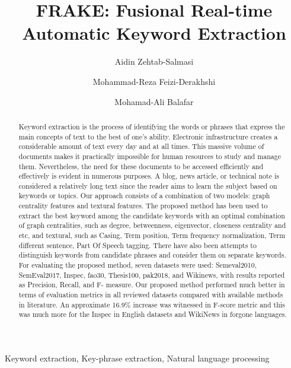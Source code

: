 \documentclass[3p]{elsarticle}
\begin{document}
\begin{frontmatter}

\title{
FRAKE: Fusional Real-time Automatic Keyword Extraction\\
}


\author[cominsys]{Aidin Zehtab-Salmasi}
\author[cominsys]{Mohammad-Reza Feizi-Derakhshi}

\author[UT]{Mohamad-Ali Balafar}


\address[cominsys]{Computerized Intelligence Systems Laboratory, Department of Computer Engineering, University of Tabriz, Tabriz, IRAN.}
\address[UT]{Department of Computer Engineering, University of Tabriz, Tabriz, IRAN.}

\begin{abstract}
{Keyword extraction is the process of identifying the words or phrases that express the main concepts of text to the best of one's ability. Electronic infrastructure creates a considerable amount of text every day and at all times. This massive volume of documents makes it practically impossible for human resources to study and manage them. Nevertheless, the need for these documents to be accessed efficiently and effectively is evident in numerous purposes. A blog, news article, or technical note is considered a relatively long text since the reader aims to learn the subject based on keywords or topics. Our approach consists of a combination of two models: graph centrality features and textural features. The proposed method has been used to extract the best keyword among the candidate keywords with an optimal combination of graph centralities, such as degree, betweenness, eigenvector, closeness centrality and etc, and textural, such as Casing, Term position, Term frequency normalization, Term different sentence, Part Of Speech tagging. There have also been attempts to distinguish keywords from candidate phrases and consider them on separate keywords. For evaluating the proposed method, seven datasets were used: Semeval2010, SemEval2017, Inspec, fao30, Thesis100, pak2018, and Wikinews, with results reported as Precision, Recall, and F- measure. Our proposed method performed much better in terms of evaluation metrics in all reviewed datasets compared with available methods in literature. An approximate 16.9\% increase was witnessed in F-score metric and this was much more for the Inspec in English datasets and WikiNews in forgone languages.}

\end{abstract}

\begin{keyword}
Keyword extraction, Key-phrase extraction, Natural language processing
\end{keyword}

\end{frontmatter}
\end{document}
